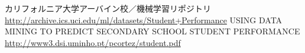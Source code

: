 \documentclass[9pt]{ltjsarticle}
\begin{document}
    
\newpage 

\begin{thebibliography}{99}
%
 カリフォルニア大学アーバイン校／機械学習リポジトリ\\
\url{http://archive.ics.uci.edu/ml/datasets/Student+Performance}
%
 USING DATA MINING TO PREDICT SECONDARY SCHOOL STUDENT
PERFORMANCE \\
\url{http://www3.dsi.uminho.pt/pcortez/student.pdf}


\end{thebibliography}


    
\end{document}
